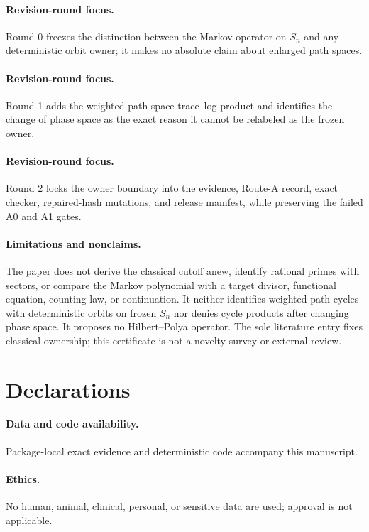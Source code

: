 \documentclass[9pt]{extarticle}
\begin{document}
\ifcase\CRevisionRound
\paragraph{Revision-round focus.} Round 0 freezes the distinction between the
Markov operator on $S_n$ and any deterministic orbit owner; it makes no
absolute claim about enlarged path spaces.
\or
\paragraph{Revision-round focus.} Round 1 adds the weighted path-space
trace--log product and identifies the change of phase space as the exact
reason it cannot be relabeled as the frozen owner.
\or
\paragraph{Revision-round focus.} Round 2 locks the owner boundary into the
evidence, Route-A record, exact checker, repaired-hash mutations, and release
manifest, while preserving the failed A0 and A1 gates.
\fi

\paragraph{Limitations and nonclaims.}
The paper does not derive the classical cutoff anew, identify rational
primes with sectors, or compare the Markov polynomial with a target divisor,
functional equation, counting law, or continuation.  It neither identifies
weighted path cycles with deterministic orbits on frozen $S_n$ nor denies
cycle products after changing phase space.  It proposes no Hilbert--Polya
operator.  The sole literature entry fixes classical ownership; this
certificate is not a novelty survey or external review.

\section*{Declarations}
\paragraph{Data and code availability.} Package-local exact evidence and
deterministic code accompany this manuscript.
\paragraph{Ethics.} No human, animal, clinical, personal, or sensitive data
are used; approval is not applicable.
\end{document}
